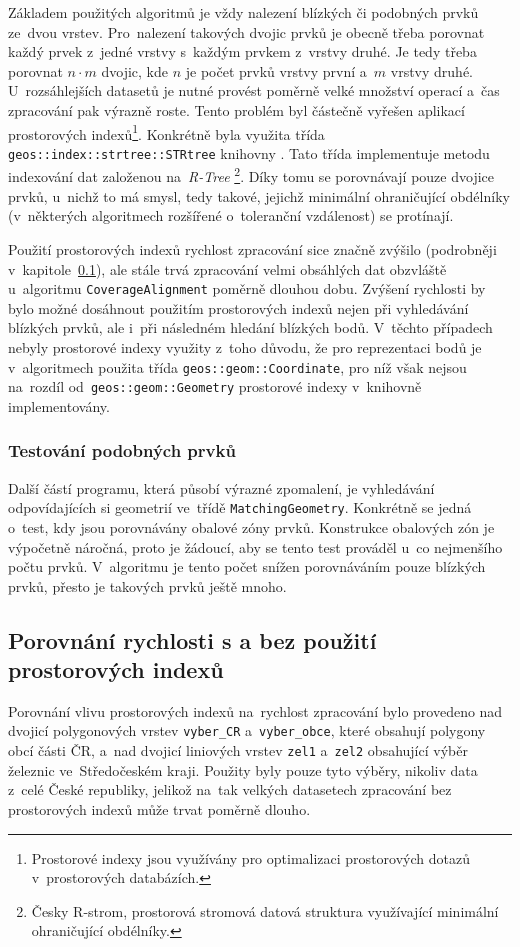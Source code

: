 Základem použitých algoritmů je vždy nalezení blízkých či podobných prvků 
ze~dvou vrstev. Pro~nalezení takových dvojic prvků je obecně třeba porovnat 
každý prvek z~jedné vrstvy s~každým prvkem z~vrstvy druhé. Je tedy třeba 
porovnat $n\cdot m$ dvojic, kde $n$ je počet prvků vrstvy první a~$m$ vrstvy 
druhé. U~rozsáhlejších datasetů je nutné provést poměrně velké množství 
operací a~čas zpracování pak výrazně roste. Tento problém byl částečně vyřešen 
aplikací prostorových indexů\footnote{Prostorové indexy jsou využívány pro 
optimalizaci prostorových dotazů v~prostorových databázích.}. Konkrétně byla 
využita třída \texttt{geos::index::strtree::STRtree} knihovny  .
Tato třída implementuje metodu indexování dat založenou na~\textit{R-Tree}
\footnote{Česky R-strom, prostorová stromová datová struktura využívající 
minimální ohraničující obdélníky.}. Díky tomu se porovnávají pouze dvojice prvků, 
u~nichž to má smysl, tedy takové, jejichž minimální ohraničující obdélníky 
(v~některých algoritmech rozšířené o~toleranční vzdálenost) se protínají. 

Použití prostorových indexů rychlost zpracování sice značně zvýšilo (podrobněji 
v~kapitole~\ref{problemy-test}), ale stále trvá zpracování velmi obsáhlých dat 
obzvláště u~algoritmu \linebreak[5] \texttt{Coverage\-Alignment} poměrně 
dlouhou dobu. Zvýšení rychlosti by bylo možné dosáhnout použitím prostorových 
indexů nejen při vyhledávání blízkých prvků, ale i~při následném hledání 
blízkých bodů. V~těchto případech nebyly prostorové indexy využity z~toho 
důvodu, že pro reprezentaci bodů je v~algoritmech použita třída 
\texttt{geos::geom::Coordinate}, pro níž však nejsou na~rozdíl 
od~\texttt{geos::geom::Geometry} prostorové indexy v~knihovně 
 implementovány.

\subsubsection{Testování podobných prvků}

Další částí programu, která působí výrazné zpomalení, je vyhledávání
odpovídajících si geometrií ve~třídě \texttt{MatchingGeometry}. Konkrétně
se jedná o~test, kdy jsou porovnávány obalové zóny prvků. Konstrukce
obalových zón je výpočetně náročná, proto je žádoucí, aby se tento test
prováděl u~co nejmenšího počtu prvků. V~algoritmu je tento počet snížen
porovnáváním pouze blízkých prvků, přesto je takových prvků ještě mnoho.


\subsection{Porovnání rychlosti s a bez použití prostorových indexů}
\label{problemy-test}
Porovnání vlivu prostorových indexů na~rychlost zpracování bylo provedeno 
nad dvojicí polygonových vrstev \texttt{vyber\_CR} a~\texttt{vyber\_obce}, 
které obsahují polygony obcí části ČR, a~nad dvojicí li\-niových vrstev 
\texttt{zel1} a~\texttt{zel2} obsahující výběr železnic ve~Středočeském 
kraji. Použity byly pouze tyto výběry, nikoliv data z~celé České republiky,
jelikož na~tak velkých datasetech zpracování bez prostorových indexů může 
trvat poměrně dlouho.

